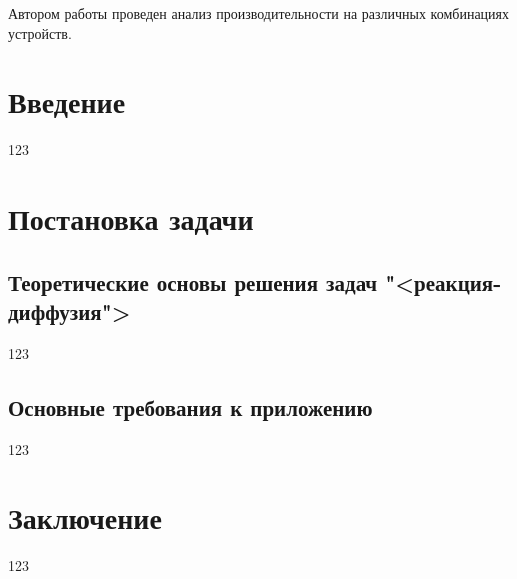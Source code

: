 \documentclass[a4paper, 14pt]{extarticle}
\theoremstyle{definition}
\begin{document}
\par Автором работы проведен анализ производительности на различных комбинациях устройств.




\tableofcontents





\section*{Введение}
123




\section{Постановка задачи}

\subsection{Теоретические основы решения задач "<реакция-диффузия">}
123



\subsection{Основные требования к приложению}
123



\section*{Заключение}
123






%
%
%
%
%
\end{document}
